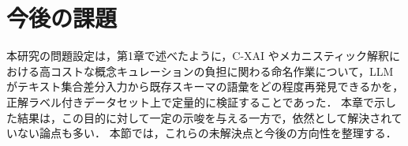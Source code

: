 




\section{今後の課題}

本研究の問題設定は，第1章で述べたように，C-XAI やメカニスティック解釈における高コストな概念キュレーションの負担に関わる命名作業について，LLM がテキスト集合差分入力から既存スキーマの語彙をどの程度再発見できるかを，正解ラベル付きデータセット上で定量的に検証することであった．
本章で示した結果は，この目的に対して一定の示唆を与える一方で，依然として解決されていない論点も多い．
本節では，これらの未解決点と今後の方向性を整理する．

